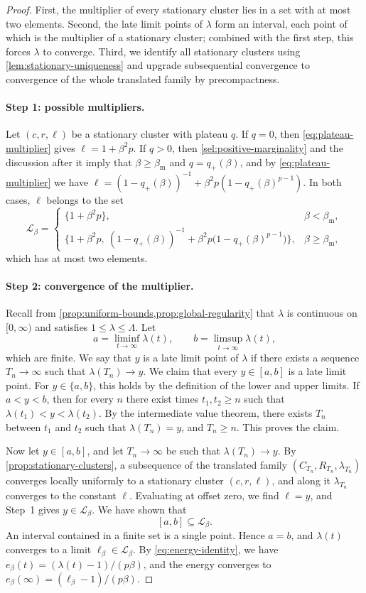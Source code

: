 \begin{proof}
First, the multiplier of every stationary cluster lies in a set with at most two elements. Second, the late limit points of $\lambda$ form an interval, each point of which is the multiplier of a stationary cluster; combined with the first step, this forces $\lambda$ to converge. Third, we identify all stationary clusters using \cref{lem:stationary-uniqueness} and upgrade subsequential convergence to convergence of the whole translated family by precompactness.

\paragraph{Step 1: possible multipliers.}
Let $(c,r,\ell)$ be a stationary cluster with plateau $q$. If $q=0$, then \eqref{eq:plateau-multiplier} gives $\ell=1+\beta^2p$. If $q>0$, then \cref{sel:positive-marginality} and the discussion after it imply that $\beta\ge\beta_{\mathrm m}$ and $q=q_+(\beta)$, and by \eqref{eq:plateau-multiplier} we have $\ell=(1-q_+(\beta))^{-1}+\beta^2p(1-q_+(\beta)^{p-1})$. In both cases, $\ell$ belongs to the set
\[
 \mathcal L_\beta=
 \begin{cases}
 \{1+\beta^2p\}, & \beta<\beta_{\mathrm m},\\[2pt]
 \bigl\{1+\beta^2p,\ (1-q_+(\beta))^{-1}+\beta^2p\bigl(1-q_+(\beta)^{p-1}\bigr)\bigr\}, & \beta\ge\beta_{\mathrm m},
 \end{cases}
\]
which has at most two elements.

\paragraph{Step 2: convergence of the multiplier.}
Recall from \cref{prop:uniform-bounds,prop:global-regularity} that $\lambda$ is continuous on $[0,\infty)$ and satisfies $1\le\lambda\le\Lambda$. Let
\[
 a=\liminf_{t\to\infty}\lambda(t),\qquad b=\limsup_{t\to\infty}\lambda(t),
\]
which are finite. We say that $y$ is a late limit point of $\lambda$ if there exists a sequence $T_n\to\infty$ such that $\lambda(T_n)\to y$. We claim that every $y\in[a,b]$ is a late limit point. For $y\in\{a,b\}$, this holds by the definition of the lower and upper limits. If $a<y<b$, then for every $n$ there exist times $t_1,t_2\ge n$ such that $\lambda(t_1)<y<\lambda(t_2)$. By the intermediate value theorem, there exists $T_n$ between $t_1$ and $t_2$ such that $\lambda(T_n)=y$, and $T_n\ge n$. This proves the claim.

Now let $y\in[a,b]$, and let $T_n\to\infty$ be such that $\lambda(T_n)\to y$. By \cref{prop:stationary-clusters}, a subsequence of the translated family $(C_{T_n},R_{T_n},\lambda_{T_n})$ converges locally uniformly to a stationary cluster $(c,r,\ell)$, and along it $\lambda_{T_n}$ converges to the constant $\ell$. Evaluating at offset zero, we find $\ell=y$, and Step~1 gives $y\in\mathcal L_\beta$. We have shown that
\[
 [a,b]\subseteq\mathcal L_\beta.
\]
An interval contained in a finite set is a single point. Hence $a=b$, and $\lambda(t)$ converges to a limit $\ell_\beta\in\mathcal L_\beta$. By \eqref{eq:energy-identity}, we have $e_\beta(t)=(\lambda(t)-1)/(p\beta)$, and the energy converges to $e_\beta(\infty)=(\ell_\beta-1)/(p\beta)$.


\end{proof}
